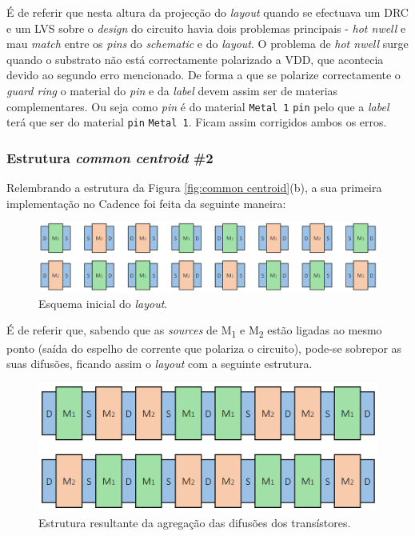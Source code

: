 \documentclass[11pt]{article}
\numberwithin{equation}{section}
\begin{document}
É de referir que nesta altura da projecção do \textit{layout} quando se efectuava um DRC e um LVS sobre o \textit{design} do circuito havia dois problemas principais - \textit{hot nwell} e mau \textit{match} entre os \textit{pins} do \textit{schematic} e do \textit{layout}. O problema de \textit{hot nwell} surge quando o substrato não está correctamente polarizado a VDD, que acontecia devido ao segundo erro mencionado. De forma a que se polarize correctamente o \textit{guard ring} o material do \textit{pin} e da \textit{label} devem assim ser de materias complementares. Ou seja como \textit{pin} é do material \texttt{Metal 1} \texttt{pin} pelo que a \textit{label} terá que ser do material \texttt{pin} \texttt{Metal 1}. Ficam assim corrigidos ambos os erros.

\subsubsection{Estrutura \textit{common centroid} \#2}

Relembrando a estrutura da Figura \ref{fig:common centroid}(b), a sua primeira implementação no Cadence foi feita da seguinte maneira:

\begin{figure}[H]
	\centering
	\includegraphics[keepaspectratio=true, scale=0.30]{teoricas/layout/cc2_1}
	\vspace{-0.5em}
	\caption{Esquema inicial do \textit{layout}.}
	\vspace{-0.8em} 
\end{figure}

É de referir que, sabendo que as \textit{sources} de M\textsubscript{1} e M\textsubscript{2} estão ligadas ao mesmo ponto (saída do espelho de corrente que polariza o circuito), pode-se sobrepor as suas difusões, ficando assim o \textit{layout} com a seguinte estrutura.

\begin{figure}[H]
	\centering
	\includegraphics[keepaspectratio=true, scale=0.30]{teoricas/layout/cc2_2}
	\vspace{-0.5em}
	\caption{Estrutura resultante da agregação das difusões dos transístores.}
	\vspace{-0.8em} 
\end{figure}
\end{document}
